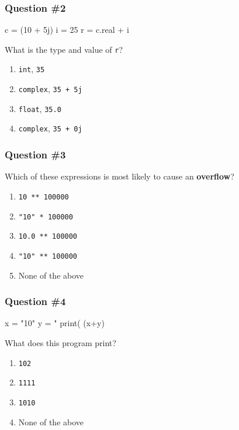 \documentclass[11pt]{beamer}
\begin{document}
\begin{frame}[fragile]
  \frametitle{Question \#2}
  \Enlarge

  \begin{semiverbatim}
c = (10 + 5j)
i = 25
r = c.real + i
  \end{semiverbatim}
  What is the type and value of \texttt{r}?
  \begin{enumerate}[label=\Alph*]
  \item  \texttt{int}, \texttt{35}
  \item  \texttt{complex}, \texttt{35 + 5j}
  \item  \texttt{float}, \texttt{35.0}
  \item  \texttt{complex}, \texttt{35 + 0j}
  \end{enumerate}
\end{frame}

\begin{frame}
  \frametitle{Question \#3}
  \Enlarge

  Which of these expressions is most likely to cause an \textbf{overflow}?
  \begin{enumerate}[label=\Alph*]
  \item  \texttt{10 ** 100000}
  \item  \texttt{"10" * 100000}
  \item  \texttt{10.0 ** 100000}
  \item  \texttt{"10" ** 100000}
  \item  None of the above
  \end{enumerate}
\end{frame}

\begin{frame}[fragile]
  \frametitle{Question \#4}
  \Enlarge

  \begin{semiverbatim}
x = "10"
y = "%
print( (x+y) %
  \end{semiverbatim}
  What does this program print?
  \begin{enumerate}[label=\Alph*]
  \item  \texttt{102}
  \item  \texttt{1111}
  \item  \texttt{1010}
  \item  None of the above
  \end{enumerate}
\end{frame}
\end{document}
